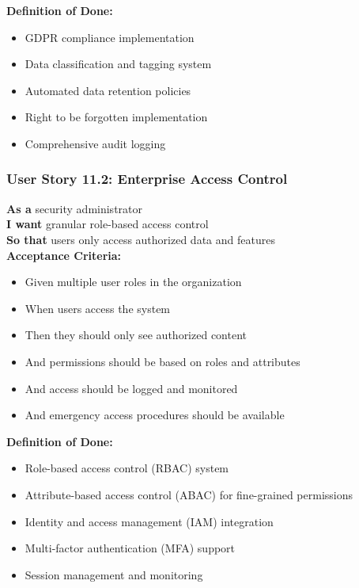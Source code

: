 \begin{table}[H]
\begin{tcolorbox}[colback=lightgray, colframe=primaryblue, title=US-11.1: Comprehensive Data Governance]
\textbf{Definition of Done:}
\begin{itemize}
    \item GDPR compliance implementation
    \item Data classification and tagging system
    \item Automated data retention policies
    \item Right to be forgotten implementation
    \item Comprehensive audit logging
\end{itemize}
\end{tcolorbox}

\subsubsection{User Story 11.2: Enterprise Access Control}

\begin{tcolorbox}[colback=lightgray, colframe=primaryblue, title=US-11.2: Enterprise Access Control]
\textbf{As a} security administrator \\
\textbf{I want} granular role-based access control \\
\textbf{So that} users only access authorized data and features \\

\textbf{Acceptance Criteria:}
\begin{itemize}
    \item Given multiple user roles in the organization
    \item When users access the system
    \item Then they should only see authorized content
    \item And permissions should be based on roles and attributes
    \item And access should be logged and monitored
    \item And emergency access procedures should be available
\end{itemize}

\textbf{Definition of Done:}
\begin{itemize}
    \item Role-based access control (RBAC) system
    \item Attribute-based access control (ABAC) for fine-grained permissions
    \item Identity and access management (IAM) integration
    \item Multi-factor authentication (MFA) support
    \item Session management and monitoring
\end{itemize}
\end{tcolorbox}


\end{table}
